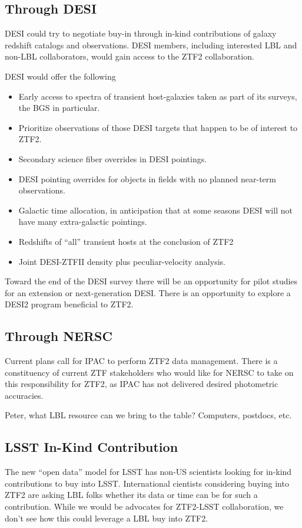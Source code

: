 \documentclass[11pt, oneside]{article}   	%
\begin{document}
\subsection{Through DESI}

DESI could try to negotiate buy-in through in-kind contributions of galaxy redshift catalogs and observations.  DESI members, including interested
LBL and non-LBL collaborators, would gain access to the ZTF2 collaboration.

DESI would offer the following
\begin{itemize}
\item Early access to spectra of transient host-galaxies taken as part of its surveys, the BGS in particular.
\item Prioritize observations of those DESI  targets that happen to be of interest to ZTF2.
\item Secondary science fiber overrides in DESI pointings.
\item DESI pointing overrides for objects in fields with no planned near-term observations.
\item Galactic time allocation, in anticipation that at some seasons DESI will not have many extra-galactic pointings.
\item Redshifts of ``all'' transient hosts at the conclusion of ZTF2
\item Joint DESI-ZTFII density plus peculiar-velocity analysis.
\end{itemize}

Toward the end of the DESI survey there will be an opportunity for pilot studies for an extension or next-generation DESI.  
There is an opportunity to explore a DESI2 program beneficial to ZTF2.

\subsection{Through NERSC}
Current plans call for IPAC to perform ZTF2 data management. There is a constituency of current ZTF stakeholders who
would like for NERSC to take on this responsibility for ZTF2, as IPAC has not delivered desired photometric accuracies.

Peter, what LBL resource can we bring to the table?  Computers, postdocs, etc.


\subsection{LSST In-Kind Contribution}
The new ``open data'' model for LSST has non-US scientists looking for in-kind contributions to buy into
LSST.  International cientists considering buying into ZTF2 are asking LBL folks whether its data or time can be for such a contribution.
While we would be advocates for ZTF2-LSST collaboration, we don't see how this could leverage a  LBL
buy into ZTF2.
\end{document}
